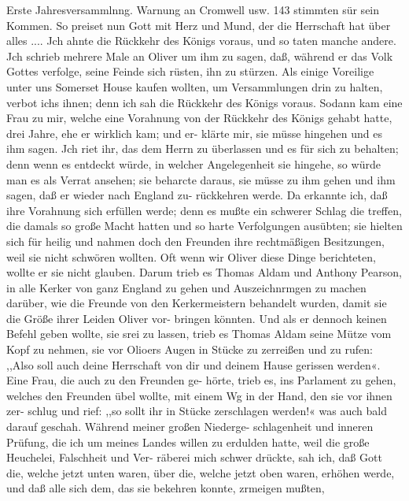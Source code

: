 Erste Jahresversammlnng. Warnung an Cromwell usw. 143
stimmten sür sein Kommen. So preiset nun Gott mit Herz und
Mund, der die Herrschaft hat über alles .... Jch ahnte die
Rückkehr des Königs voraus, und so taten manche andere. Jch
schrieb mehrere Male an Oliver um ihm zu sagen, daß, während
er das Volk Gottes verfolge, seine Feinde sich rüsten, ihn zu
stürzen. Als einige Voreilige unter uns Somerset House kaufen
wollten, um Versammlungen drin zu halten, verbot ichs ihnen;
denn ich sah die Rückkehr des Königs voraus. Sodann kam eine
Frau zu mir, welche eine Vorahnung von der Rückkehr des
Königs gehabt hatte, drei Jahre, ehe er wirklich kam; und er-
klärte mir, sie müsse hingehen und es ihm sagen. Jch riet ihr,
das dem Herrn zu überlassen und es für sich zu behalten; denn
wenn es entdeckt würde, in welcher Angelegenheit sie hingehe, so
würde man es als Verrat ansehen; sie beharcte daraus, sie müsse
zu ihm gehen und ihm sagen, daß er wieder nach England zu-
rückkehren werde. Da erkannte ich, daß ihre Vorahnung sich
erfüllen werde; denn es mußte ein schwerer Schlag die treffen,
die damals so große Macht hatten und so harte Verfolgungen
ausübten; sie hielten sich für heilig und nahmen doch den Freunden
ihre rechtmäßigen Besitzungen, weil sie nicht schwören wollten.
Oft wenn wir Oliver diese Dinge berichteten, wollte er sie nicht
glauben. Darum trieb es Thomas Aldam und Anthony Pearson,
in alle Kerker von ganz England zu gehen und Auszeichnrmgen
zu machen darüber, wie die Freunde von den Kerkermeistern
behandelt wurden, damit sie die Größe ihrer Leiden Oliver vor-
bringen könnten. Und als er dennoch keinen Befehl geben wollte,
sie srei zu lassen, trieb es Thomas Aldam seine Mütze vom Kopf
zu nehmen, sie vor Olioers Augen in Stücke zu zerreißen und zu
rufen: ,,Also soll auch deine Herrschaft von dir und deinem Hause
gerissen werden«. Eine Frau, die auch zu den Freunden ge-
hörte, trieb es, ins Parlament zu gehen, welches den Freunden
übel wollte, mit einem Wg in der Hand, den sie vor ihnen zer-
schlug und rief: ,,so sollt ihr in Stücke zerschlagen werden!« was
auch bald darauf geschah. Während meiner großen Niederge-
schlagenheit und inneren Prüfung, die ich um meines Landes willen
zu erdulden hatte, weil die große Heuchelei, Falschheit und Ver-
räberei mich schwer drückte, sah ich, daß Gott die, welche jetzt
unten waren, über die, welche jetzt oben waren, erhöhen werde,
und daß alle sich dem, das sie bekehren konnte, zrmeigen mußten,


